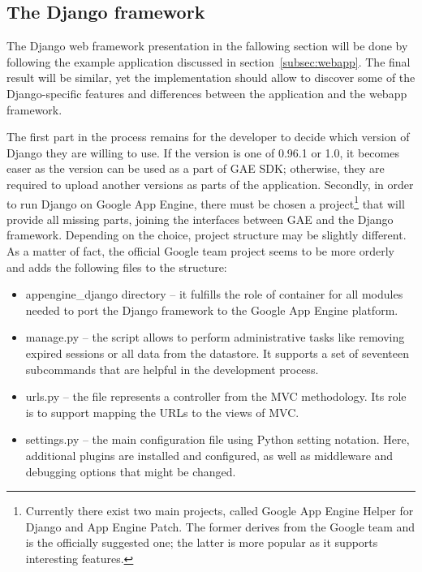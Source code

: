 \subsection{The Django framework}\label{subsec:django}
The Django web framework presentation in the fallowing section will be done by following the example application discussed in section~\ref{subsec:webapp}. The final result will be similar, yet the implementation should allow to discover some of the Django-specific features and differences between the application and the webapp framework. 

The first part in the process remains for the developer to decide which version of Django they are willing to use. If the version is one of 0.96.1 or 1.0, it becomes easer as the version can be used as a part of GAE SDK; otherwise, they are required to upload another versions as parts of the application. Secondly, in order to run Django on Google App Engine, there must be chosen a project\footnote{Currently there exist two main projects, called Google App Engine Helper for Django and App Engine Patch. The former derives from the Google team and is the officially suggested one; the latter is more popular as it supports interesting features.} that will provide all missing parts, joining the interfaces between GAE and the Django framework. Depending on the choice, project structure may be slightly different. As a matter of fact, the official Google team project seems to be more orderly and adds the following files to the structure:
\begin{itemize}
\item{appengine\_django directory -- it fulfills the role of container for all modules needed to port the Django framework to the Google App Engine platform.}
\item{manage.py -- the script allows to perform administrative tasks like removing expired sessions or all data from the datastore. It supports a set of seventeen subcommands that are helpful in the development process.}
\item{urls.py -- the file represents a controller from the MVC methodology. Its role is to support mapping the URLs to the views of MVC.}
\item{settings.py -- the main configuration file using Python setting notation. Here, additional plugins are installed and configured, as well as middleware and debugging options that might be changed.}
\end{itemize}

